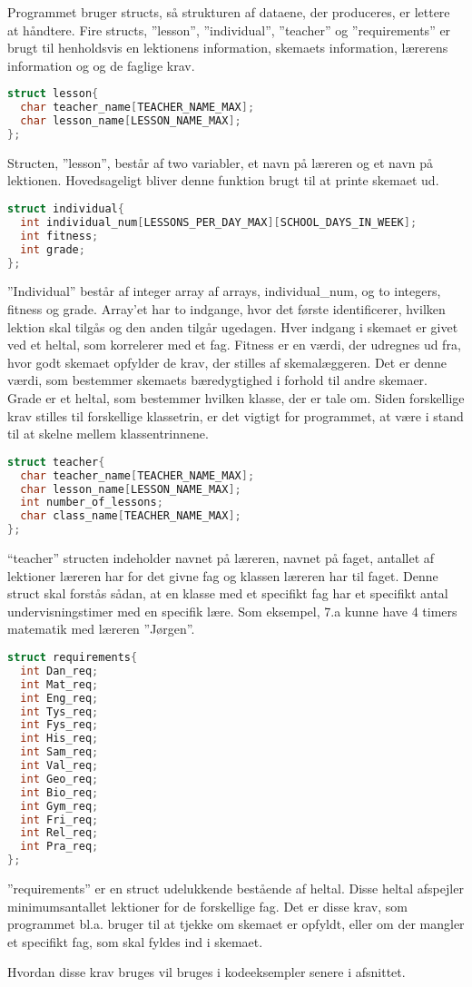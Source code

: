 Programmet bruger structs, så strukturen af dataene, der produceres, er lettere at håndtere. Fire structs, ”lesson”, ”individual”, ”teacher” og ”requirements” er brugt til henholdsvis en lektionens information, skemaets information, lærerens information og og de faglige krav.

\begin{lstlisting}[language = C]
struct lesson{
  char teacher_name[TEACHER_NAME_MAX];
  char lesson_name[LESSON_NAME_MAX];
};
\end{lstlisting}
Structen, ”lesson”, består af two variabler, et navn på læreren og et navn på lektionen. Hovedsageligt bliver denne funktion brugt til at printe skemaet ud.

\begin{lstlisting}[language = C]
struct individual{
  int individual_num[LESSONS_PER_DAY_MAX][SCHOOL_DAYS_IN_WEEK];
  int fitness;
  int grade;
};
\end{lstlisting}
”Individual” består af integer array af arrays, individual\_num, og to integers, fitness og grade. Array’et har to indgange, hvor det første identificerer, hvilken lektion skal tilgås og den anden tilgår ugedagen. Hver indgang i skemaet er givet ved et heltal, som korrelerer med et fag. Fitness er en værdi, der udregnes ud fra, hvor godt skemaet opfylder de krav, der stilles af skemalæggeren. Det er denne værdi, som bestemmer skemaets bæredygtighed i forhold til andre skemaer. Grade er et heltal, som bestemmer hvilken klasse, der er tale om. Siden forskellige krav stilles til forskellige klassetrin, er det vigtigt for programmet, at være i stand til at skelne mellem klassentrinnene.

\begin{lstlisting}[language = C]
struct teacher{
  char teacher_name[TEACHER_NAME_MAX];
  char lesson_name[LESSON_NAME_MAX];
  int number_of_lessons;
  char class_name[TEACHER_NAME_MAX];
};
\end{lstlisting}
“teacher” structen indeholder navnet på læreren, navnet på faget, antallet af lektioner læreren har for det givne fag og klassen læreren har til faget. Denne struct skal forstås sådan, at en klasse med et specifikt fag har et specifikt antal undervisningstimer med en specifik lære. Som eksempel, 7.a kunne have 4 timers matematik med læreren ”Jørgen”. 

\begin{lstlisting}[language = C]
struct requirements{
  int Dan_req;
  int Mat_req;
  int Eng_req;
  int Tys_req;
  int Fys_req;
  int His_req;
  int Sam_req;
  int Val_req;
  int Geo_req;
  int Bio_req;
  int Gym_req;
  int Fri_req;
  int Rel_req;
  int Pra_req;
};
\end{lstlisting}
”requirements” er en struct udelukkende bestående af heltal. Disse heltal afspejler minimumsantallet lektioner for de forskellige fag. Det er disse krav, som programmet bl.a. bruger til at tjekke om skemaet er opfyldt, eller om der mangler et specifikt fag, som skal fyldes ind i skemaet.

Hvordan disse krav bruges vil bruges i kodeeksempler senere i afsnittet.
